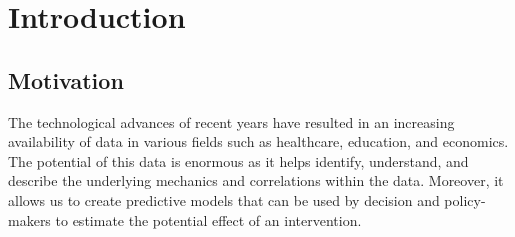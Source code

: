 %

\chapter{\label{ch:1-intro}Introduction} 



\section{Motivation}
The technological advances of recent years have resulted in an increasing availability of data in various fields such as healthcare, education, and economics. 
The potential of this data is enormous as it helps identify, understand, and describe the underlying mechanics and correlations within the data. Moreover, it allows us to create predictive models that can be used by decision and policy-makers %
 to estimate the potential effect of an intervention.




